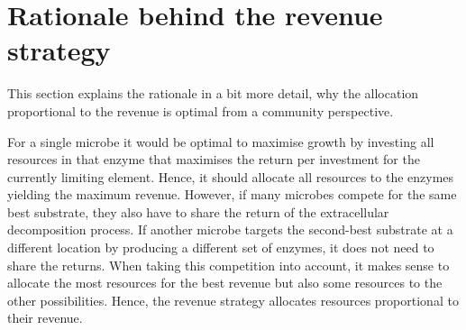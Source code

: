 \section{Rationale behind the revenue strategy \label{app:revenueRational}}    

This section explains the rationale in a bit more detail, why
the allocation proportional to the revenue is optimal from a community
perspective.

For a single microbe it would be optimal to maximise growth by investing all
resources in that enzyme that maximises the return per investment for the
currently limiting element. Hence, it should allocate all resources to the
enzymes yielding the maximum revenue.
However, if many microbes compete for the same best substrate, they also have to
share the return of the extracellular decomposition process. If another microbe
targets the second-best substrate at a different location by producing a
different set of enzymes, it does not need to share the returns. When taking
this competition into account, it makes sense to allocate the most resources for
the best revenue but also some resources to the other possibilities. Hence, the
revenue strategy allocates resources proportional to their revenue.




